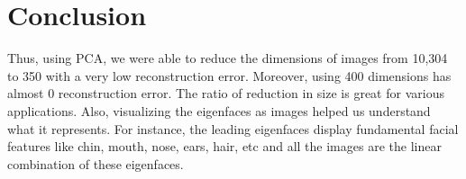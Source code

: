 \documentclass[letterpaper,12pt]{article}
\begin{document}
\section{Conclusion}\label{conclusion}
Thus, using PCA, we were able to reduce the dimensions of images from 10,304 to 350 with a very low reconstruction error. Moreover, using 400 dimensions has almost 0 reconstruction error. The ratio of reduction in size is great for various applications. Also, visualizing the eigenfaces as images helped us understand what it represents. For instance, the leading eigenfaces display fundamental facial features like chin,  mouth, nose, ears, hair, etc and all the images are the linear combination of these eigenfaces.
\end{document}
